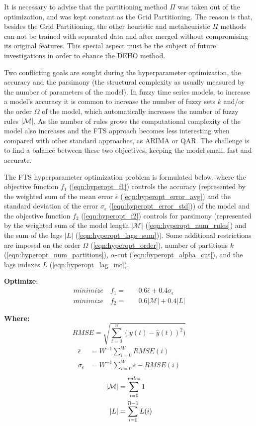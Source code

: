 It is necessary to advise that the partitioning method $\Pi$ was taken out of the optimization, and was kept constant as the Grid Partitioning. The reason is that, besides the Grid Partitioning, the other heuristic and metaheuristic $\Pi$ methods can not be trained with separated data and after merged without compromising its original features. This special aspect must be the subject of future investigations in order to ehance the DEHO method.

Two conflicting goals are sought during the hyperparameter optimization, the accuracy and the parsimony (the structural complexity as usually measured by the number of parameters of the model). In fuzzy time series models, to increase a model's accuracy  it is common to increase the number of fuzzy sets $k$ and/or the order $\Omega$ of the model, which automatically increases the number of fuzzy rules $|\mathcal{M}|$. As the number of rules grows the computational complexity of the model also increases and the FTS approach becomes less interesting when compared with other standard approaches, as ARIMA or QAR. The challenge is to find a balance between these two objectives, keeping the model small, fast and accurate.

The FTS hyperparameter optimization problem is formulated below, where the objective function $f_1$ (\ref{eqn:hyperopt_f1}) controls the accuracy (represented by the weighted sum of the mean error $\bar{\epsilon}$  (\ref{eqn:hyperopt_error_avg}) and the standard deviation of the error $\sigma_\epsilon$ (\ref{eqn:hyperopt_error_std})) of the model and the objective function $f_2$ (\ref{eqn:hyperopt_f2}) controls for parsimony (represented by the weighted sum of the model length $|\mathcal{M}|$ (\ref{eqn:hyperopt_num_rules}) and the sum of the lags $|L|$ (\ref{eqn:hyperopt_lags_sum})). Some additional restrictions are imposed on the order $\Omega$ (\ref{eqn:hyperopt_order}), number of partitions $k$ (\ref{eqn:hyperopt_num_partitions}), $\alpha$-cut (\ref{eqn:hyperopt_alpha_cut}), and the lags indexes $L$ (\ref{eqn:hyperopt_lag_inc}). 

\textbf{Optimize}:
\begin{align}
minimize \quad  f_1  = & \quad 0.6\bar{\epsilon} + 0.4\sigma_\epsilon \label{eqn:hyperopt_f1}\\
minimize \quad  f_2  = & \quad 0.6|\mathcal{M}| + 0.4|L|  \label{eqn:hyperopt_f2}
\end{align}

\textbf{Where:}
\begin{equation}
RMSE = \sqrt{\sum_{t=0}^n (y(t) - \hat{y}(t))^2 )}
 \label{eqn:hyperopt_rmse}
\end{equation}
\begin{align}
\bar{\epsilon} & =  W^{-1}\sum_{i=0}^W RMSE(i) \label{eqn:hyperopt_error_avg} \\
\sigma_\epsilon & =  W^{-1}\sum_{i=0}^W \bar{\epsilon} - RMSE(i)  \label{eqn:hyperopt_error_std}
\end{align}
\begin{align}
|\mathcal{M}| &= \sum_{i=0}^{rules} 1  \label{eqn:hyperopt_num_rules} \\
|L| &= \sum_{i=0}^{\Omega-1} L(i)  \label{eqn:hyperopt_lags_sum} 
\end{align}

